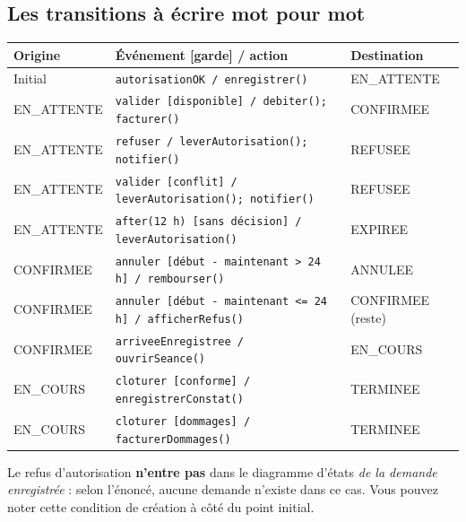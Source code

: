 \documentclass[10pt,a4paper]{article}
\begin{document}
\subsection{Les transitions à écrire mot pour mot}
\begin{longtable}{@{}p{29mm}p{74mm}p{34mm}@{}}
\toprule
Origine & Événement [garde] / action & Destination \\
\midrule\endhead
Initial & \texttt{autorisationOK / enregistrer()} & EN\_ATTENTE \\
EN\_ATTENTE & \texttt{valider [disponible] / debiter(); facturer()} & CONFIRMEE \\
EN\_ATTENTE & \texttt{refuser / leverAutorisation(); notifier()} & REFUSEE \\
EN\_ATTENTE & \texttt{valider [conflit] / leverAutorisation(); notifier()} & REFUSEE \\
EN\_ATTENTE & \texttt{after(12 h) [sans décision] / leverAutorisation()} & EXPIREE \\
CONFIRMEE & \texttt{annuler [début - maintenant > 24 h] / rembourser()} & ANNULEE \\
CONFIRMEE & \texttt{annuler [début - maintenant <= 24 h] / afficherRefus()} & CONFIRMEE (reste) \\
CONFIRMEE & \texttt{arriveeEnregistree / ouvrirSeance()} & EN\_COURS \\
EN\_COURS & \texttt{cloturer [conforme] / enregistrerConstat()} & TERMINEE \\
EN\_COURS & \texttt{cloturer [dommages] / facturerDommages()} & TERMINEE \\
\bottomrule
\end{longtable}
\begin{warningbox}
Le refus d'autorisation \textbf{n'entre pas} dans le diagramme d'états \emph{de la demande enregistrée} : selon l'énoncé, aucune demande n'existe dans ce cas. Vous pouvez noter cette condition de création à côté du point initial.
\end{warningbox}
\end{document}
